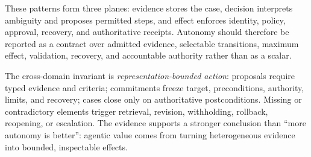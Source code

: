 These patterns form three planes: evidence stores the case, decision interprets ambiguity and proposes permitted steps, and effect enforces identity, policy, approval, recovery, and authoritative receipts. Autonomy should therefore be reported as a contract over admitted evidence, selectable transitions, maximum effect, validation, recovery, and accountable authority rather than as a scalar.

The cross-domain invariant is \emph{representation-bounded action}: proposals require typed evidence and criteria; commitments freeze target, preconditions, authority, limits, and recovery; cases close only on authoritative postconditions. Missing or contradictory elements trigger retrieval, revision, withholding, rollback, reopening, or escalation. The evidence supports a stronger conclusion than ``more autonomy is better'': agentic value comes from turning heterogeneous evidence into bounded, inspectable effects.
